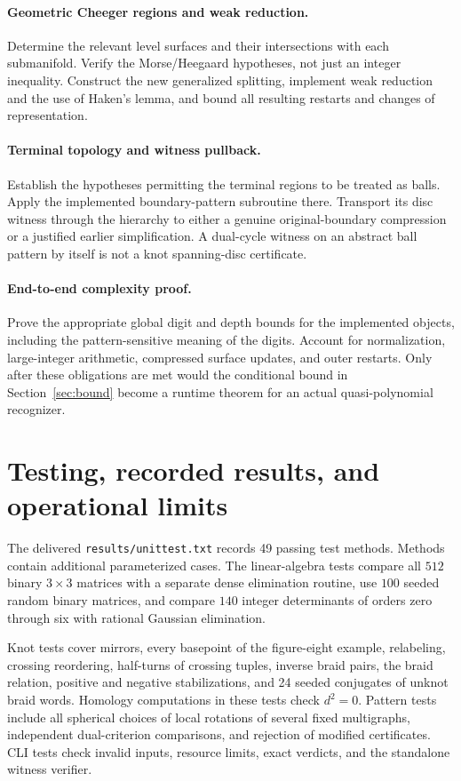\documentclass[11pt]{article}
\theoremstyle{remark}\newtheorem{remark}[theorem]{Remark}
\newcommand{\code}[1]{\texttt{#1}}
\begin{document}
\paragraph{Geometric Cheeger regions and weak reduction.}
Determine the relevant level surfaces and their intersections with each
submanifold. Verify the Morse/Heegaard hypotheses, not just an integer
inequality. Construct the new generalized splitting, implement weak reduction
and the use of Haken's lemma, and bound all resulting restarts and changes of
representation.

\paragraph{Terminal topology and witness pullback.}
Establish the hypotheses permitting the terminal regions to be treated as
balls. Apply the implemented boundary-pattern subroutine there. Transport its
disc witness through the hierarchy to either a genuine original-boundary
compression or a justified earlier simplification. A dual-cycle witness on an
abstract ball pattern by itself is not a knot spanning-disc certificate.

\paragraph{End-to-end complexity proof.}
Prove the appropriate global digit and depth bounds for the implemented
objects, including the pattern-sensitive meaning of the digits. Account for
normalization, large-integer arithmetic, compressed surface updates, and
outer restarts. Only after these obligations are met would the conditional
bound in Section~\ref{sec:bound} become a runtime theorem for an actual
quasi-polynomial recognizer.

\section{Testing, recorded results, and operational limits}

The delivered \code{results/unittest.txt} records 49 passing test methods.
Methods contain additional parameterized cases. The linear-algebra tests
compare all $512$ binary $3\times3$ matrices with a separate dense elimination
routine, use $100$ seeded random binary matrices, and compare $140$ integer
determinants of orders zero through six with rational Gaussian elimination.

Knot tests cover mirrors, every basepoint of the figure-eight example,
relabeling, crossing reordering, half-turns of crossing tuples, inverse braid
pairs, the braid relation, positive and negative stabilizations, and 24 seeded
conjugates of unknot braid words. Homology computations in these tests check
$d^2=0$. Pattern tests include all spherical choices of local rotations of
several fixed multigraphs, independent dual-criterion comparisons, and
rejection of modified certificates. CLI tests check invalid inputs, resource
limits, exact verdicts, and the standalone witness verifier.
\end{document}
